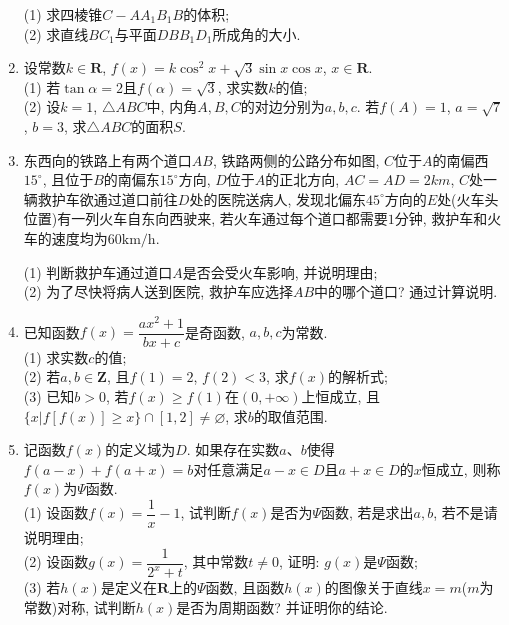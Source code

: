 \documentclass[10pt,a4paper]{article}
\begin{document}
\begin{enumerate}[1.]
(1)	求四棱锥$C-AA_1B_1B$的体积;\\
(2)	求直线$BC_1$与平面$DBB_1D_1$所成角的大小.
\item 设常数$k\in \mathbf{R}$, $f(x)=k\cos^2x+\sqrt 3\sin x\cos x$, $x\in \mathbf{R}$.\\
(1) 若$\tan \alpha =2$且$f(\alpha)=\sqrt 3$, 求实数$k$的值;\\
(2) 设$k=1$, $\triangle ABC$中, 内角$A,B,C$的对边分别为$a,b,c$. 若$f(A)=1$, $a=\sqrt 7$, $b=3$, 求$\triangle ABC$的面积$S$.
\item 东西向的铁路上有两个道口$AB$, 铁路两侧的公路分布如图, $C$位于$A$的南偏西$15^\circ$, 且位于$B$的南偏东$15^\circ$方向, $D$位于$A$的正北方向, $AC=AD=2km$, $C$处一辆救护车欲通过道口前往$D$处的医院送病人, 发现北偏东$45^\circ$方向的$E$处(火车头位置)有一列火车自东向西驶来, 若火车通过每个道口都需要$1$分钟, 救护车和火车的速度均为$60\text{km/h}$.
\begin{center}
\end{center}
(1) 判断救护车通过道口$A$是否会受火车影响, 并说明理由;\\
(2) 为了尽快将病人送到医院, 救护车应选择$AB$中的哪个道口? 通过计算说明.
\item 已知函数$f(x)=\dfrac{ax^2+1}{bx+c}$是奇函数, $a,b,c$为常数.\\
(1)	求实数$c$的值;\\
(2)	若$a,b\in \mathbf{Z}$, 且$f(1)=2$, $f(2)<3$, 求$f(x)$的解析式;\\
(3) 已知$b>0$, 若$f(x)\ge f(1)$在$(0,+\infty)$上恒成立, 且$\{x|f[f(x)]\ge x\}\cap [1,2]\ne \varnothing$, 求$b$的取值范围.
\item 记函数$f(x)$的定义域为$D$. 如果存在实数$a$、$b$使得$f(a-x)+f(a+x)=b$对任意满足$a-x\in D$且$a+x\in D$的$x$恒成立, 则称$f(x)$为$\Psi$函数.\\
(1) 设函数$f(x)=\dfrac 1x-1$, 试判断$f(x)$是否为$\Psi$函数, 若是求出$a,b$, 若不是请说明理由;\\
(2) 设函数$g(x)=\dfrac 1{2^x+t}$, 其中常数$t\ne 0$, 证明: $g(x)$是$\Psi$函数;\\
(3) 若$h(x)$是定义在$\mathbf{R}$上的$\Psi$函数, 且函数$h(x)$的图像关于直线$x=m$($m$为常数)对称, 试判断$h(x)$是否为周期函数? 并证明你的结论.


\end{enumerate}
\end{document}
